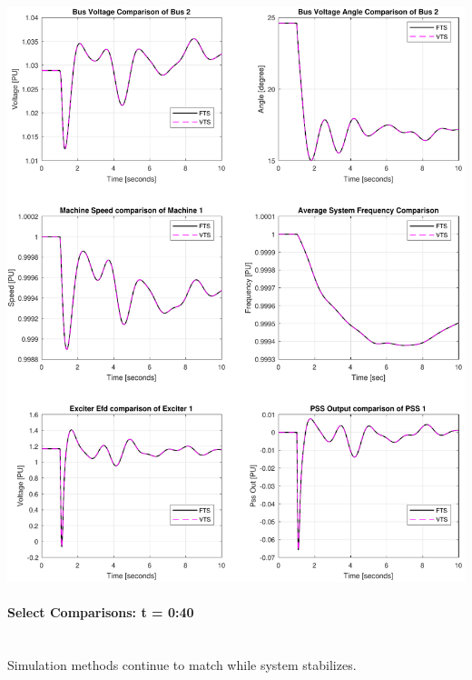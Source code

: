 \documentclass[12pt]{article}
\begin{document}
\includegraphics[width=\linewidth]{MWdetailComp0}

\pagebreak
\paragraph{Select Comparisons: t = 0:40} \ \\
Simulation methods continue to match while system stabilizes.\\
\end{document}
